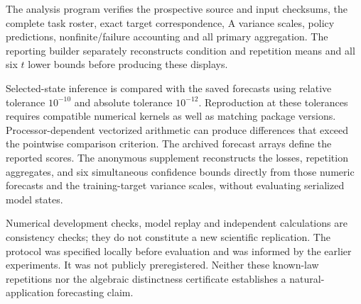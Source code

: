 The analysis program verifies the prospective source and input checksums,
the complete task roster, exact target correspondence, A variance scales,
policy predictions, nonfinite/failure accounting and all primary aggregation.
The reporting builder separately reconstructs condition and repetition means
and all six $t$ lower bounds before producing these displays.

Selected-state inference is compared with the saved forecasts using relative
tolerance $10^{-10}$ and absolute tolerance $10^{-12}$. Reproduction at these
tolerances requires compatible numerical kernels as well as matching package
versions. Processor-dependent vectorized arithmetic can produce differences
that exceed the pointwise comparison criterion. The archived forecast arrays
define the reported scores. The anonymous supplement reconstructs the losses,
repetition aggregates, and six simultaneous confidence bounds directly from
those numeric forecasts and the training-target variance scales, without
evaluating serialized model states.

Numerical
development checks, model replay and independent calculations are consistency
checks; they do not constitute a new scientific replication. The protocol was specified locally before evaluation and was informed
by the earlier experiments. It was not publicly preregistered. Neither these known-law repetitions nor the algebraic
distinctness certificate establishes a natural-application forecasting claim.
